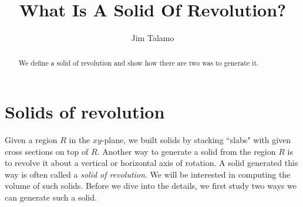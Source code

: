 \documentclass{ximera}
\author{Jim Talamo}
\title[Dig-In:]{What Is A Solid Of Revolution?}
\begin{document}
\begin{abstract}
  We define a solid of revolution and show how there are two was to generate it.
\end{abstract}
\maketitle


\section{Solids of revolution}

Given a region $R$ in the $xy$-plane, we built solids by stacking ``slabs" with given cross sections on top of $R$.  Another way to generate a solid from the region $R$ is to revolve it about a vertical or horizontal axis of rotation.  A solid generated this way is often called a \emph{solid of revolution}.  We will be interested in computing the volume of such solids.  Before we dive into the details, we first study two ways we can generate such a solid. 
\end{document}
